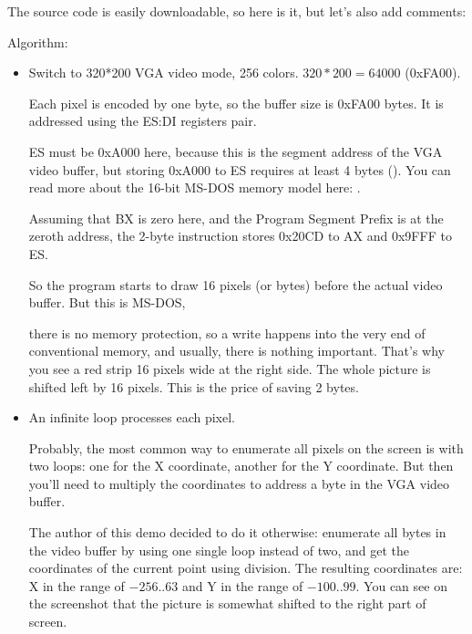 %
The source code is easily downloadable, so here is it, but let's also add comments:



Algorithm:

\begin{itemize}
\item Switch to 320*200 VGA video mode, 256 colors. 
$320*200=64000$ (0xFA00). 

Each pixel is encoded by one byte, so the buffer size is 0xFA00 bytes.
It is addressed using the ES:DI registers pair.

ES must be 0xA000 here, because this is the segment address of 
the VGA video buffer, but storing 0xA000 to ES requires at least 4 bytes (). 
You can read more about the 16-bit MS-DOS memory model here: 
.


Assuming that BX is zero here, and the Program Segment Prefix is at the zeroth
address, the 2-byte  instruction stores 0x20CD to AX and 0x9FFF to ES.

So the program starts to draw 16 pixels (or bytes) before the actual video buffer.
But this is MS-DOS, 

there is no memory protection, so a write happens into the very end of conventional memory, and usually, there is nothing important.
That's why you see a red strip 16 
pixels wide at the right side.
The whole picture is shifted left by 16 pixels.
This is the price of saving 2 bytes.

\item An infinite loop processes each pixel.

Probably, the most common way to enumerate all pixels on the screen is with two loops: 
one for the X coordinate, another for the Y coordinate.
But then you'll need 
to multiply the coordinates to address a byte in the VGA video buffer.

The author of this demo decided to do it otherwise: enumerate all bytes in the video buffer by using one single loop instead 
of two, and get the coordinates of the current point using division.
The resulting coordinates are: X in the range of $-256..63$ and Y in the range of $-100..99$.
You can see on 
the screenshot that the picture is somewhat shifted to the right part of screen.


\end{itemize}

